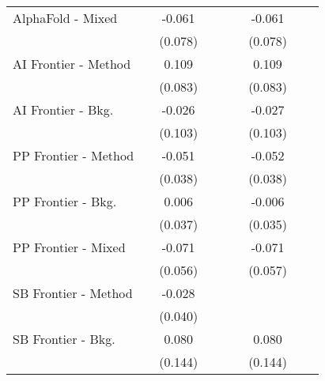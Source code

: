 \begin{tabular}{lcccccccc}
   AlphaFold - Mixed                              &             & -0.061  &       &       &             & -0.061  &        &   \\   
                                                  &             & (0.078) &       &       &             & (0.078) &        &   \\   
   AI Frontier - Method                           &             & 0.109   &       &       &             & 0.109   &        &   \\   
                                                  &             & (0.083) &       &       &             & (0.083) &        &   \\   
   AI Frontier - Bkg.                             &             & -0.026  &       &       &             & -0.027  &        &   \\   
                                                  &             & (0.103) &       &       &             & (0.103) &        &   \\   
   PP Frontier - Method                           &             & -0.051  &       &       &             & -0.052  &        &   \\   
                                                  &             & (0.038) &       &       &             & (0.038) &        &   \\   
   PP Frontier - Bkg.                             &             & 0.006   &       &       &             & -0.006  &        &   \\   
                                                  &             & (0.037) &       &       &             & (0.035) &        &   \\   
   PP Frontier - Mixed                            &             & -0.071  &       &       &             & -0.071  &        &   \\   
                                                  &             & (0.056) &       &       &             & (0.057) &        &   \\   
   SB Frontier - Method                           &             & -0.028  &       &       &             &         &        &   \\   
                                                  &             & (0.040) &       &       &             &         &        &   \\   
   SB Frontier - Bkg.                             &             & 0.080   &       &       &             & 0.080   &        &   \\   
                                                  &             & (0.144) &       &       &             & (0.144) &        &   \\   

\end{tabular}
